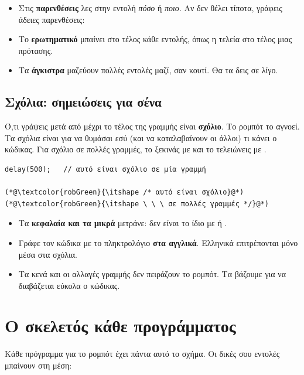 \documentclass[11pt,a4paper]{article}
\newcommand{\code}[1]{\texttt{\detokenize{#1}}}
\begin{document}
\begin{itemize}[leftmargin=1.4em]
  \item Στις \textbf{παρενθέσεις} \code{( )} λες στην εντολή \emph{πόσο} ή \emph{ποιο}.
        Αν δεν θέλει τίποτα, γράφεις άδειες παρενθέσεις: \code{start();}
  \item Το \textbf{ερωτηματικό} \code{;} μπαίνει στο τέλος κάθε εντολής, όπως η τελεία στο τέλος μιας πρότασης.
  \item Τα \textbf{άγκιστρα} \code{{ }} μαζεύουν πολλές εντολές μαζί, σαν κουτί. Θα τα δεις σε λίγο.
\end{itemize}

\subsection*{Σχόλια: σημειώσεις για σένα}
Ό,τι γράψεις μετά από \code{//} μέχρι το τέλος της γραμμής είναι \textbf{σχόλιο}. Το ρομπότ το αγνοεί.
Τα σχόλια είναι για να θυμάσαι εσύ (και να καταλαβαίνουν οι άλλοι) τι κάνει ο κώδικας.
Για σχόλιο σε πολλές γραμμές, το ξεκινάς με \code{/*} και το τελειώνεις με \code{*/}.

\begin{lstlisting}
delay(500);   // αυτό είναι σχόλιο σε μία γραμμή

(*@\textcolor{robGreen}{\itshape /* αυτό είναι σχόλιο}@*)
(*@\textcolor{robGreen}{\itshape \ \ \ σε πολλές γραμμές */}@*)
\end{lstlisting}

\begin{careful}
\begin{itemize}[leftmargin=1.2em]
  \item Τα \textbf{κεφαλαία και τα μικρά} μετράνε: \code{delay} δεν είναι το ίδιο με \code{Delay} ή \code{DELAY}.
  \item Γράφε τον κώδικα με το πληκτρολόγιο \textbf{στα αγγλικά}. Ελληνικά επιτρέπονται μόνο μέσα στα σχόλια.
  \item Τα κενά και οι αλλαγές γραμμής δεν πειράζουν το ρομπότ. Τα βάζουμε για να διαβάζεται εύκολα ο κώδικας.
\end{itemize}
\end{careful}

\section{Ο σκελετός κάθε προγράμματος}

Κάθε πρόγραμμα για το ρομπότ έχει πάντα αυτό το σχήμα. Οι δικές σου εντολές μπαίνουν στη μέση:
\end{document}
